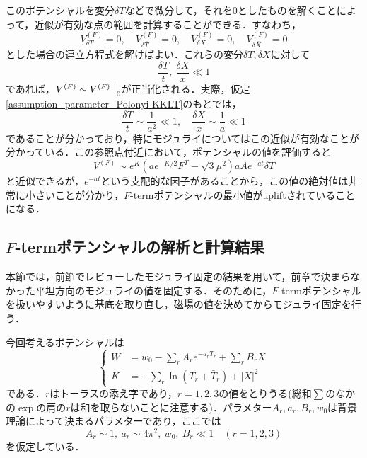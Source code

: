 \documentclass[a4paper,uplatex,dvipdfmx]{jsarticle}
\theoremstyle{definition}
\begin{document}
このポテンシャルを変分$\delta T$などで微分して，それを0としたものを解くことによって，近似が有効な点の範囲を計算することができる．すなわち，
\begin{equation}
   V^{(F)}_{\delta T}
   =
   0
   ,\quad
   V^{(F)}_{\delta \bar{T}}
   =
   0
   ,\quad
   V^{(F)}_{\delta X}
   =
   0
   ,\quad
   V^{(F)}_{\delta \bar{X}}
   =
   0
   \nonumber
\end{equation}
とした場合の連立方程式を解けばよい．これらの変分$\delta T,\delta X$に対して
\begin{equation}
   \frac{\delta T}{t}
   ,\ 
   \frac{\delta X}{x}
   \ll
   1
   \nonumber
\end{equation}
であれば，$V^{(F)}\sim V^{(F)}\left.\vphantom{\frac{1}{2}}\right|_{0}$が正当化される．実際，仮定\eqref{assumption_parameter_Polonyi-KKLT}のもとでは，
\begin{equation}
   \frac{\delta T}{t}
   \sim
   \frac{1}{a^2}
   \ll
   1
   ,\quad
   \frac{\delta X}{x}
   \sim
   \frac{1}{a}
   \ll
   1
   \nonumber
\end{equation}
であることが分かっており\cite{Abe_MoreFterm_2007a}，特にモジュライについてはこの近似が有効なことが分かっている．この参照点付近において，ポテンシャルの値を評価すると
\begin{equation}
   V^{(F)}
   \sim
   e^{K}
   (
      ae^{-K/2}F^{T}
      -
      \sqrt{3}\mu^2  
   )
   aAe^{-at}\delta T
   \nonumber
\end{equation}
と近似できるが，$e^{-at}$という支配的な因子があることから，この値の絶対値は非常に小さいことが分かり，$F$-termポテンシャルの最小値がupliftされていることになる．


\subsection{\texorpdfstring{$F$}{F}-termポテンシャルの解析と計算結果}

本節では，前節でレビューしたモジュライ固定の結果を用いて，前章で決まらなかった平坦方向のモジュライの値を固定する．そのために，$F$-termポテンシャルを扱いやすいように基底を取り直し，磁場の値を決めてからモジュライ固定を行う．

今回考えるポテンシャルは
\begin{equation}
   \left\{
      \begin{alignedat}{1}
         W
         &=
         w_{0}
         -
         \sum_{r}A_{r}e^{-a_{r}T_{r}}
         +
         \sum_{r}B_{r}X
         \\
         K
         &=
         -
         \sum_{r}\ln(T_{r}+\bar{T}_{r})
         +
         |X|^2
      \end{alignedat}
   \right.
   \label{potential_now_before}
\end{equation}
である．$r$はトーラスの添え字であり，$r=1,2,3$の値をとりうる(総和$\sum$のなかの$\exp$の肩の$r$は和を取らないことに注意する)．パラメター$A_{r},a_{r},B_{r},w_{0}$は背景理論によって決まるパラメターであり，ここでは
\begin{equation}
   A_{r}\sim 1
   ,\ 
   a_{r}\sim 4\pi^2  
   ,\ 
   w_{0},\ B_{r}\ll 1
   \quad
   (r=1,2,3)
   \label{assumption_parameter_now}
\end{equation}
を仮定している．
\end{document}
